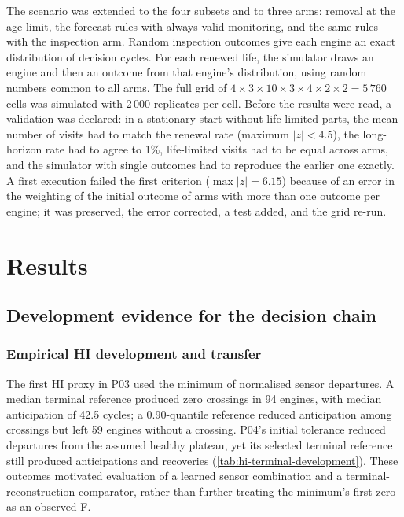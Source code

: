 \documentclass[preprint,12pt]{elsarticle}
\begin{document}
The scenario was extended to the four subsets and to three arms: removal at the age limit, the forecast rules with always-valid monitoring, and the same rules with the inspection arm. Random inspection outcomes give each engine an exact distribution of decision cycles. For each renewed life, the simulator draws an engine and then an outcome from that engine's distribution, using random numbers common to all arms. The full grid of $4\times3\times10\times3\times4\times2\times2=5\,760$ cells was simulated with 2\,000 replicates per cell. Before the results were read, a validation was declared: in a stationary start without life-limited parts, the mean number of visits had to match the renewal rate (maximum $|z|<4.5$), the long-horizon rate had to agree to 1\%, life-limited visits had to be equal across arms, and the simulator with single outcomes had to reproduce the earlier one exactly. A first execution failed the first criterion ($\max|z|=6.15$) because of an error in the weighting of the initial outcome of arms with more than one outcome per engine; it was preserved, the error corrected, a test added, and the grid re-run.

\section{Results}\label{sec:preliminary}


\subsection{Development evidence for the decision chain}\label{sec:development}


\subsubsection{Empirical HI development and transfer}

The first HI proxy in P03 used the minimum of normalised sensor departures. A median terminal reference produced zero crossings in 94 engines, with median anticipation of 42.5 cycles; a 0.90-quantile reference reduced anticipation among crossings but left 59 engines without a crossing. P04's initial tolerance reduced departures from the assumed healthy plateau, yet its selected terminal reference still produced anticipations and recoveries (\cref{tab:hi-terminal-development}). These outcomes motivated evaluation of a learned sensor combination and a terminal-reconstruction comparator, rather than further treating the minimum's first zero as an observed F.
\end{document}
